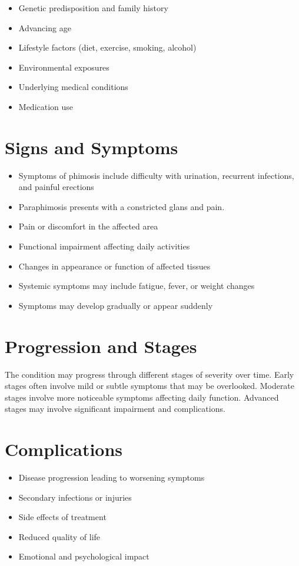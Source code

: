 \begin{itemize}[noitemsep]
  \item Genetic predisposition and family history
  \item Advancing age
  \item Lifestyle factors (diet, exercise, smoking, alcohol)
  \item Environmental exposures
  \item Underlying medical conditions
  \item Medication use
\end{itemize}
\section{Signs and Symptoms}
\begin{itemize}[noitemsep]
  \item Symptoms of phimosis include difficulty with urination, recurrent infections, and painful erections
  \item Paraphimosis presents with a constricted glans and pain.
  \item Pain or discomfort in the affected area
  \item Functional impairment affecting daily activities
  \item Changes in appearance or function of affected tissues
  \item Systemic symptoms may include fatigue, fever, or weight changes
  \item Symptoms may develop gradually or appear suddenly
\end{itemize}
\section{Progression and Stages}
The condition may progress through different stages of severity over time. Early stages often involve mild or subtle symptoms that may be overlooked. Moderate stages involve more noticeable symptoms affecting daily function. Advanced stages may involve significant impairment and complications.
\section{Complications}
\begin{itemize}[noitemsep]
  \item Disease progression leading to worsening symptoms
  \item Secondary infections or injuries
  \item Side effects of treatment
  \item Reduced quality of life
  \item Emotional and psychological impact
\end{itemize}
